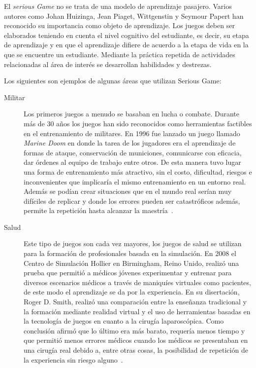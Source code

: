 El \emph{serious Game} no se trata de una modelo de aprendizaje pasajero. Varios
autores como Johan Huizinga, Jean Piaget, Wittgenstin y Seymour Papert han
reconocido su importancia  como objeto de aprendizaje. Los juegos deben ser
elaborados teniendo en cuenta el nivel cognitivo del estudiante, es decir, su
etapa de aprendizaje y en que el aprendizaje difiere de acuerdo a la etapa de
vida en la que se encuentre un estudiante. Mediante la práctica repetida de
actividades relacionadas al área de interés se desarrollan habilidades y
destrezas\cite{education:games}. 

Los siguientes son ejemplos de algunas áreas que utilizan Serious Game:

\begin{description}

\item[Militar] Los primeros juegos a menudo se basaban en lucha o combate.
	Durante más de 30 años los juegos han sido reconocidos como herramientas
	factibles en el entrenamiento de militares. En 1996 fue lanzado un juego
	llamado \emph{Marine Doom} en donde la tarea de los jugadores era el
	aprendizaje de formas de ataque, conservación de municiones, comunicarse
	con eficacia, dar órdenes al equipo de trabajo entre otros. De esta
	manera tuvo lugar una forma de entrenamiento más atractivo, sin el
	costo, dificultad, riesgos e inconvenientes que implicaría el mismo
	entrenamiento en un entorno real. Además se podían crear situaciones que
	en el mundo real serían muy difíciles de replicar y donde los errores
	pueden ser catastróficos además, permite la repetición hasta alcanzar la
	maestría~\cite{education:games}.


\item[Salud] Este tipo de juegos son cada vez mayores, los juegos de salud se
	utilizan para la formación de profesionales basada en la simulación. En
	2008 el Centro de Simulación Hollier en Birmingham, Reino Unido, realizó
	una prueba que permitió a médicos jóvenes experimentar y entrenar para
	diversos escenarios médicos a través de maniquíes virtuales como
	pacientes, de este modo el aprendizaje se da por la experiencia. En su
	disertación, Roger D. Smith, realizó una comparación entre la enseñanza
	tradicional y la formación mediante realidad virtual y el uso de
	herramientas basadas en la tecnología de juegos en cuanto a la cirugía
	laparoscópica. Como conclusión afirmó que lo último era más barato,
	requería menos tiempo y que permitió menos errores médicos cuando los
	médicos se presentaban en una cirugía real debido a, entre otras cosas,
	la posibilidad de repetición de la experiencia sin riesgo
	alguno~\cite{education:games}.




\end{description}
